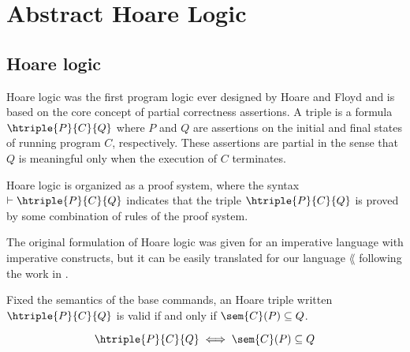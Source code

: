 \section{Abstract Hoare Logic}

\subsection{Hoare logic}
Hoare logic was the first program logic ever designed by Hoare and Floyd 
\cite{Hoare69, Floyd93} and is based on the core concept of partial correctness 
assertions. A triple is a formula $\htriple{P}{C}{Q}$ where $P$ and $Q$ are 
assertions on the initial and final states of running program $C$, respectively. 
These assertions are partial in the sense that $Q$ is meaningful only when the 
execution of $C$ terminates.

Hoare logic is organized as a proof system, where the syntax 
$\vdash \htriple{P}{C}{Q}$ indicates that the triple 
$\htriple{P}{C}{Q}$ is proved by some combination of rules of the proof system.

The original formulation of Hoare logic was given for an imperative language 
with imperative constructs, but it can be easily translated for our language 
$\lang$ following the work in \cite{Moller21}.

\begin{definition}
  \label{def:hoare}
  Fixed the semantics of the base commands, an Hoare triple written 
  $\htriple{P}{C}{Q}$ is valid if and only if $\sem{C}(P) \subseteq Q$.

  $$\htriple{P}{C}{Q} \iff \sem{C}(P) \subseteq Q$$
\end{definition}


